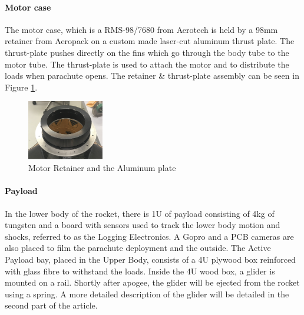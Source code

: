\paragraph{Motor case}
\hfill \break
The motor case, which is a RMS-98/7680 from Aerotech is held by a 98mm retainer from Aeropack on a custom made laser-cut aluminum thrust plate. The thrust-plate pushes directly on the fins which go through the body tube to the motor tube. The thrust-plate is used to attach the motor and to distribute the loads when parachute opens.
 The retainer \& thrust-plate assembly can be seen in Figure \ref{f:motor_retainer_2}.
\begin{figure}[h!]
        \centering
        \includegraphics[width=0.3\textwidth]{img/motor_retainer.png}
        \caption{Motor Retainer and the Aluminum plate}
        \label{f:motor_retainer_2}
    \end{figure}


\paragraph{Payload}
\hfill \break
In the lower body of the rocket, there is 1U of payload 
consisting of 4kg of tungsten and a board with sensors used to track the lower body motion and shocks, referred to as the Logging Electronics. A Gopro and a PCB cameras are also placed to film the parachute deployment and the outside.
The Active Payload bay, placed in the Upper Body, consists of a 4U plywood box reinforced with glass fibre to withstand the loads. Inside the 4U wood box, a glider is mounted on a rail. Shortly after apogee, the glider will be ejected from the rocket using a spring. A more detailed description of the glider will be detailed in the second part of the article.



